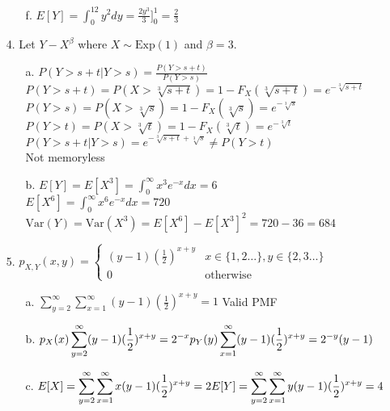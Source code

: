 \documentclass[11pt]{amsart}
\theoremstyle{definition}
\begin{document}
\begin{itemize}
\begin{itemize}
    \item[f.] $E[Y]=\int_0^12y^2dy=\frac{2y^3}3]_0^1=\frac23$
    
\end{itemize}

\item[4.] Let $Y-X^\beta$ where $X\sim\text{Exp}(1)$ and $\beta =3$.
\begin{itemize}
    \item[a.] $P(Y>s+t|Y>s)=\frac{P(Y>s+t)}{P(Y>s)}$ \\
              $P(Y>s+t)=P(X>\sqrt[3]{s+t})=1-F_X(\sqrt[3]{s+t})=e^{-\sqrt[3]{s+t}}$ \\
              $P(Y>s)=P(X>\sqrt[3]{s})=1-F_X(\sqrt[3]{s})=e^{-\sqrt[3]{s}}$ \\
              $P(Y>t)=P(X>\sqrt[3]{t})=1-F_X(\sqrt[3]{t})=e^{-\sqrt[3]{t}}$ \\
              $P(Y>s+t|Y>s)=e^{-\sqrt[3]{s+t}+\sqrt[3]{s}}\ne P(Y>t)$ \\
              Not memoryless

    \item[b.] $E[Y]=E[X^3]=\int_0^\infty x^3e^{-x}dx=6$ \\
              $E[X^6]=\int_0^\infty x^6e^{-x}dx=720$ \\
              $\text{Var}(Y)=\text{Var}(X^3)=E[X^6]-E[X^3]^2=720-36=684$
    
\end{itemize}

\item[5.] $p_{X,Y}(x,y)=\begin{cases}
    (y-1)(\frac 12)^{x+y} &x\in\{1,2\ldots\},y\in\{2,3\ldots\} \\
    0 &\text{otherwise}
\end{cases}$
\begin{itemize}
    \item[a.] $\displaystyle
              \sum_{y=2}^\infty\sum_{x=1}^\infty (y-1)(\frac 12)^{x+y}=1$  Valid PMF

    \item[b.] $\displaystyle
              p_X(x)\sum_{y=2}^\infty (y-1)(\frac 12)^{x+y}=2^{-x} \\
              p_Y(y)\sum_{x=1}^\infty (y-1)(\frac 12)^{x+y}=2^{-y}(y-1)$

    \item[c.] $\displaystyle
              E[X]=\sum_{y=2}^\infty\sum_{x=1}^\infty x(y-1)(\frac 12)^{x+y}=2\\
              E[Y]=\sum_{y=2}^\infty\sum_{x=1}^\infty y(y-1)(\frac 12)^{x+y}=4$


\end{itemize}
\end{itemize}
\end{document}
